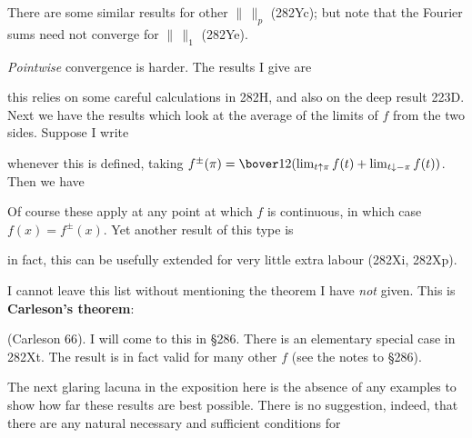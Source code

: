 {

\noindent There are some similar results for other $\|\,\|_p$ (282Yc);
but note that the Fourier sums need not converge for $\|\,\|_1$ (282Ye).

{\it Pointwise} convergence is harder.   The results I give are


\noindent this relies on some careful calculations in 282H, and also on
the deep result 223D.   Next we have the results which look at the
average of the limits of $f$ from the two sides.   Suppose I write


\noindent whenever this is defined, taking $f^{\pm}(\pi)
=\bover12(\lim_{t\uparrow\pi}f(t)+\lim_{t\downarrow-\pi}f(t))$.   Then
we have



\noindent Of course these apply at any point at which $f$ is continuous,
in which case $f(x)=f^{\pm}(x)$.
Yet another result of this type is


\noindent in fact, this can be usefully extended for very little extra
labour (282Xi, 282Xp).

I cannot leave this list without mentioning the theorem I have {\it not}
given.   This is {\bf Carleson's theorem}:


\noindent ({\smc Carleson 66}).   I will come to this in \S286.   There
is an elementary special case in 282Xt.   The result is in fact valid
for many other $f$ (see the notes to \S286).

The next glaring lacuna in the exposition here is the absence of any
examples to show how far these results are best possible.   There is no
suggestion, indeed, that there are any natural necessary and sufficient
conditions for

}
